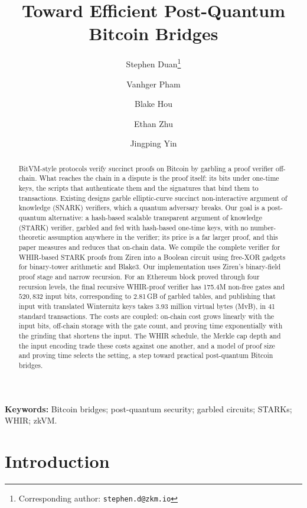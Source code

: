 \documentclass[11pt]{article}
\title{Toward Efficient Post-Quantum Bitcoin Bridges}
\author[1, 2]{Stephen Duan\thanks{Corresponding author: \texttt{stephen.d@zkm.io}}}
\author[1]{Vanhger Pham}
\author[1]{Blake Hou}
\author[2]{Ethan Zhu}
\author[1]{Jingping Yin}
\affil[1]{ZKM Team}
\affil[2]{GOAT Network}
\date{}
\begin{document}
\maketitle

\begin{abstract}
BitVM-style protocols verify succinct proofs on Bitcoin by garbling a proof
verifier off-chain. What reaches the chain in a dispute is the proof itself:
its bits under one-time keys, the scripts that authenticate them and the
signatures that bind them to transactions. Existing designs garble
elliptic-curve succinct non-interactive argument of knowledge (SNARK)
verifiers, which a quantum adversary breaks. Our goal is a post-quantum
alternative: a hash-based scalable transparent argument of knowledge (STARK)
verifier, garbled and fed with hash-based one-time keys,
with no number-theoretic assumption anywhere in the verifier; its price is a
far larger proof, and this paper measures and reduces that on-chain data.
We compile the complete verifier for WHIR-based STARK proofs from Ziren
into a Boolean circuit using free-XOR gadgets for binary-tower arithmetic
and Blake3. Our
implementation uses Ziren's binary-field proof stage and narrow recursion.
For an Ethereum block proved through four recursion levels, the final
recursive WHIR-proof verifier has
175.4M non-free gates and $520{,}832$ input bits, corresponding to
2.81\,GB of garbled tables, and publishing that input with translated
Winternitz keys takes 3.93 million virtual bytes (MvB), in 41
standard transactions. The costs are coupled: on-chain cost grows linearly
with the input bits, off-chain storage with the gate count, and proving time
exponentially with the grinding that shortens the input. The WHIR schedule,
the Merkle cap depth and the input encoding trade these costs against one
another, and a model of proof size and proving time selects the setting, a
step toward practical post-quantum Bitcoin bridges.
\end{abstract}

\noindent\textbf{Keywords:} Bitcoin bridges; post-quantum security;
garbled circuits; STARKs; WHIR; zkVM.

\section{Introduction}
\end{document}
